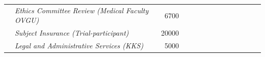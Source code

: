 \begin{table}[]
\begin{tabular}{llllrrrrcrrrrrr}
                                                         & \multicolumn{2}{l}{\cellcolor[HTML]{FFFF99}\textit{Ethics Committee Review (Medical Faculty OVGU)}}             & \multicolumn{1}{r}{\cellcolor[HTML]{FFFF99}6700}  & \cellcolor[HTML]{FFFF99}                              & \cellcolor[HTML]{FFFF99}\textit{}                     & \cellcolor[HTML]{FFFF99}\textit{}                     & \textit{}                                             & \cellcolor[HTML]{FFFF99}\textit{}                     & \cellcolor[HTML]{92D050}\textit{\textbf{}}                     & \cellcolor[HTML]{FFFF99}\textit{\textbf{}}                     & \cellcolor[HTML]{92D050}\textit{}                     & \cellcolor[HTML]{FFFF99}\textit{}                     & \cellcolor[HTML]{BFBFBF}\textit{\textbf{}}                        & \textit{\textbf{}}                                             \\
                                                         & \multicolumn{2}{l}{\cellcolor[HTML]{FFFF99}\textit{Subject Insurance (Trial-participant)}}                      & \multicolumn{1}{r}{\cellcolor[HTML]{FFFF99}20000} & \cellcolor[HTML]{FFFF99}                              & \cellcolor[HTML]{FFFF99}\textit{}                     & \cellcolor[HTML]{FFFF99}\textit{}                     & \textit{}                                             & \cellcolor[HTML]{FFFF99}\textit{}                     & \cellcolor[HTML]{92D050}\textit{\textbf{}}                     & \cellcolor[HTML]{FFFF99}\textit{\textbf{}}                     & \cellcolor[HTML]{92D050}\textit{}                     & \cellcolor[HTML]{FFFF99}\textit{}                     & \cellcolor[HTML]{BFBFBF}\textit{\textbf{}}                        & \textit{\textbf{}}                                             \\
                                                         & \multicolumn{2}{l}{\cellcolor[HTML]{FFFF99}\textit{Legal and Administrative Services (KKS)}}                    & \multicolumn{1}{r}{\cellcolor[HTML]{FFFF99}5000}  & \cellcolor[HTML]{FFFF99}                              & \cellcolor[HTML]{FFFF99}\textit{}                     & \cellcolor[HTML]{FFFF99}\textit{}                     & \textit{}                                             & \cellcolor[HTML]{FFFF99}\textit{}                     & \cellcolor[HTML]{92D050}\textit{\textbf{}}                     & \cellcolor[HTML]{FFFF99}\textit{\textbf{}}                     & \cellcolor[HTML]{92D050}\textit{}                     & \cellcolor[HTML]{FFFF99}\textit{}                     & \cellcolor[HTML]{BFBFBF}\textit{\textbf{}}                        & \textit{\textbf{}}                                             \\

\end{tabular}
\end{table}
